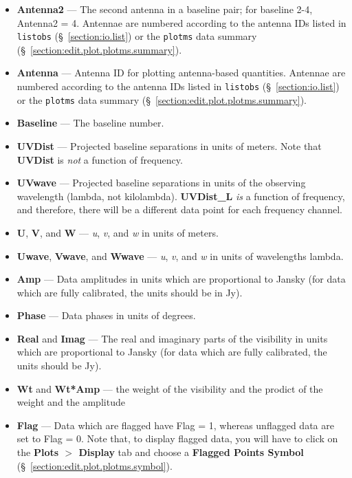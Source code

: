 \begin{itemize}
\item {\bf Antenna2} --- The second antenna in a baseline pair; for baseline 2-4, Antenna2 = 4. Antennae are numbered according to the antenna IDs listed in {\tt listobs} (\S~\ref{section:io.list}) or the {\tt plotms} data summary (\S~\ref{section:edit.plot.plotms.summary}).

\item {\bf Antenna} --- Antenna ID for plotting antenna-based quantities. Antennae are numbered according to the antenna IDs listed in {\tt listobs} (\S~\ref{section:io.list}) or the {\tt plotms} data summary (\S~\ref{section:edit.plot.plotms.summary}).

\item {\bf  Baseline} --- The baseline number.

\item {\bf UVDist} --- Projected baseline separations in units of meters. Note that {\bf UVDist} is {\it not} a function of frequency.

\item {\bf UVwave} --- Projected baseline separations in units of the observing wavelength (lambda, not kilolambda). {\bf UVDist\_L} {\it is} a function of frequency, and therefore, there will be a different data point for each frequency channel.

\item {\bf U}, {\bf V}, and {\bf W} --- {\it u}, {\it v}, and {\it w}
  in units of meters.

\item {\bf Uwave}, {\bf Vwave}, and {\bf Wwave} --- {\it u}, {\it v}, and {\it w}
  in units of wavelengths lambda.

\item {\bf Amp} --- Data amplitudes in units which are proportional to Jansky (for data which are fully calibrated, the units should be in Jy).

\item {\bf Phase} --- Data phases in units of degrees.

\item {\bf Real} and {\bf Imag} --- The real and imaginary parts of
  the visibility in units which are proportional to Jansky (for data
  which are fully calibrated, the units should be Jy).

\item {\bf Wt} and {\bf Wt*Amp} --- the weight of the visibility and
  the prodict of the weight and the amplitude


\item {\bf Flag} --- Data which are flagged have Flag = 1, whereas unflagged data are set to Flag = 0. Note that, to display flagged data, you will have to click on the {\bf Plots $>$ Display} tab and choose a {\bf Flagged Points Symbol} (\S~\ref{section:edit.plot.plotms.symbol}).


\end{itemize}
